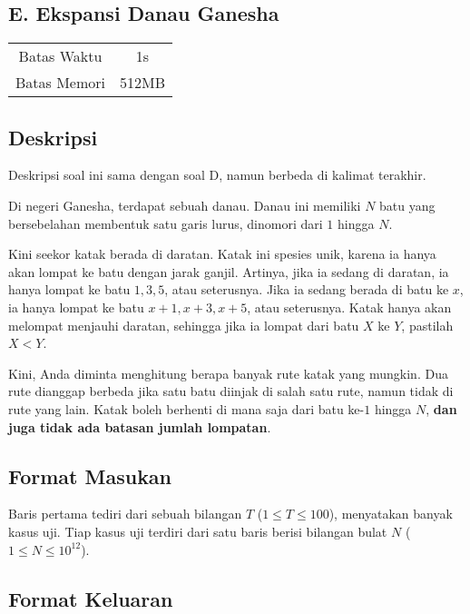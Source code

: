 \documentclass{article}
\begin{document}
\begin{center}
    \section*{E. Ekspansi Danau Ganesha}

    \begin{tabular}{ | c c | }
        \hline
        Batas Waktu  & 1s \\
        Batas Memori & 512MB \\
        \hline
    \end{tabular}
\end{center}

\subsection*{Deskripsi}

Deskripsi soal ini sama dengan soal D, namun berbeda di kalimat terakhir.

Di negeri Ganesha, terdapat sebuah danau.
Danau ini memiliki $N$ batu yang bersebelahan membentuk satu garis lurus, dinomori dari $1$ hingga $N$.

Kini seekor katak berada di daratan.
Katak ini spesies unik, karena ia hanya akan lompat ke batu dengan jarak ganjil.
Artinya, jika ia sedang di daratan, ia hanya lompat ke batu $1, 3, 5$, atau seterusnya.
Jika ia sedang berada di batu ke $x$, ia hanya lompat ke batu $x+1, x+3, x+5$, atau seterusnya.
Katak hanya akan melompat menjauhi daratan, sehingga jika ia lompat dari batu $X$ ke $Y$, pastilah $X < Y$.

Kini, Anda diminta menghitung berapa banyak rute katak yang mungkin.
Dua rute dianggap berbeda jika satu batu diinjak di salah satu rute, namun tidak di rute yang lain.
Katak boleh berhenti di mana saja dari batu ke-$1$ hingga $N$, \textbf{dan juga tidak ada batasan jumlah lompatan}.

\subsection*{Format Masukan}

Baris pertama tediri dari sebuah bilangan $T$ ($1 \leq T \leq 100$), menyatakan banyak kasus uji.
Tiap kasus uji terdiri dari satu baris berisi bilangan bulat $N$ ($1 \leq N \leq 10^{12}$).

\subsection*{Format Keluaran}
\end{document}
